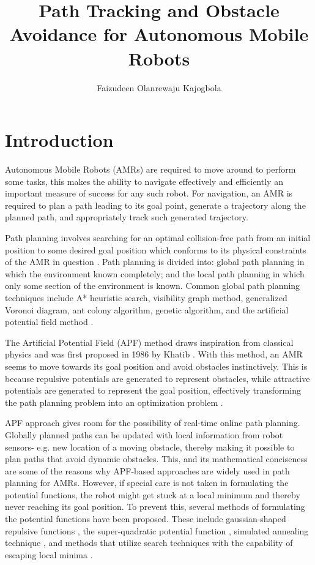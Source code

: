 \documentclass[a4paper, twocolumn]{article}
\title{\Huge{Path Tracking and Obstacle Avoidance for Autonomous Mobile Robots}}
\author{Faizudeen Olanrewaju Kajogbola}
\date{} %
\begin{document}
\maketitle

\setlength{\headsep}{5pt}
\setlength{\voffset}{-0.75in}   %

\section{Introduction}

Autonomous Mobile Robots (AMRs) are required to move around to perform some tasks, 
this makes the ability to navigate effectively and efficiently an important measure of success for any such robot.
For navigation, an AMR is required to plan a path leading to its goal point, 
generate a trajectory along the planned path, and appropriately track such generated trajectory.

Path planning involves searching for an optimal collision-free path from an initial position to some 
desired goal position which conforms to its physical constraints of the AMR in question \cite{cai1}.
Path planning is divided into: global path planning in which the environment known completely; 
and the local path planning in which only some section of the environment is known.
Common global path planning techniques include A* heuristic search, visibility graph method, generalized Voronoi diagram, 
ant colony algorithm, genetic algorithm, and the artificial potential field method \cite{kunchev1, shi1}.

The Artificial Potential Field (APF) method draws inspiration from classical physics and was first proposed in 1986 by Khatib \cite{khatib1}.
With this method, an AMR seems to move towards its goal position and avoid obstacles instinctively. 
This is because repulsive potentials are generated to represent obstacles, while attractive potentials are 
generated to represent the goal position, effectively transforming the path planning problem into an 
optimization problem \cite{ji1}. 

APF approach gives room for the possibility of real-time online path planning. 
Globally planned paths can be updated with local information from robot sensors- 
e.g. new location of a moving obstacle, thereby making it possible to plan paths that avoid dynamic obstacles.
This, and its mathematical conciseness \cite{shi1} are some of the reasons why APF-based approaches 
are widely used in path planning for AMRs.
However, if special care is not taken in formulating the potential functions, the robot might get stuck at 
a local minimum and thereby never reaching its goal position.
To prevent this, several methods of formulating the potential functions have been proposed. 
These include gaussian-shaped repulsive functions \cite{koditschek1}, the super-quadratic potential function \cite{volpe1}, 
simulated annealing technique \cite{zhu1}, and methods that utilize search techniques with the capability of escaping local minima \cite{barraquand1}.
\end{document}
